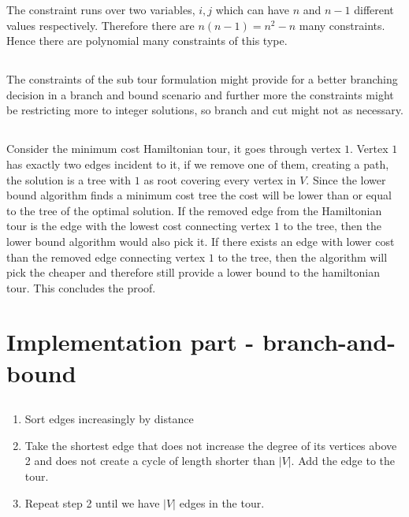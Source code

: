 The constraint runs over two variables, $i,j$ which can have $n$ and $n-1$ different values respectively. Therefore there are $n(n-1) = n^2-n$ many constraints. Hence there are polynomial many constraints of this type.

\subsection{} %
The constraints of the sub tour formulation might provide for a better branching decision in a branch and bound scenario and further more the constraints might be restricting more to integer solutions, so branch and cut might not as necessary. 

\subsection{} %
Consider the minimum cost Hamiltonian tour, it goes through vertex $1$. Vertex $1$ has exactly two edges incident to it, if we remove one of them, creating a path, the solution is a tree with $1$ as root covering every vertex in $V$. Since the lower bound algorithm finds a minimum cost tree the cost will be lower than or equal to the tree of the optimal solution. If the removed edge from the Hamiltonian tour is the edge with the lowest cost connecting vertex $1$ to the tree, then the lower bound algorithm would also pick it. If there exists an edge with lower cost than the removed edge connecting vertex $1$ to the tree, then the algorithm will pick the cheaper and therefore still  provide a lower bound to the hamiltonian tour. This concludes the proof. 

\section{Implementation part - branch-and-bound}
\subsection{}
\begin{enumerate}
	\item Sort edges increasingly by distance
	\item Take the shortest edge that does not increase the degree of its vertices above 2 and does not create a cycle of length shorter than $|V|$. Add the edge to the tour.
	\item Repeat step 2 until we have $|V|$ edges in the tour.
\end{enumerate}

